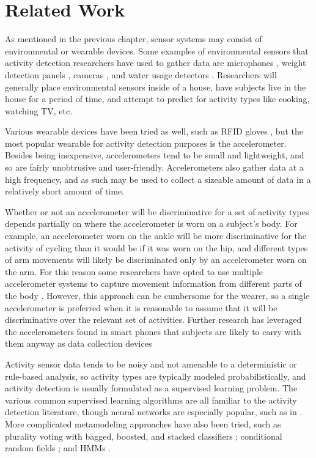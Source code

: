 \chapter{Related Work}
As mentioned in the previous chapter, sensor systems may consist
of environmental or wearable devices. Some examples of environmental
sensors that activity detection researchers have used to
gather data are microphones \cite{fogarty06}, weight detection
panels \cite{rowan05}, cameras \cite{duong05}, and water usage detectors
\cite{fogarty06}. Researchers will generally place environmental sensors
inside of a house, have subjects live in the house for a period of time, and
attempt to predict for activity types like cooking, watching TV, etc.

Various wearable devices have been tried as well, such as RFID gloves
\cite{rowan05}, but the most popular wearable for activity detection
purposes is the accelerometer. Besides being inexpensive, accelerometers
tend to be small and lightweight, and so are fairly unobtrusive and
user-friendly. Accelerometers also gather data at a high frequency, and as such
may be used to collect a sizeable amount of data in a relatively short amount
of time.

Whether or not an accelerometer will be discriminative for a
set of activity types depends partially on where the accelerometer is worn on
a subject's body. For example, an accelerometer worn on the ankle will be
more discriminative for the activity of cycling than it would be if it was worn
on the hip, and different types of arm movements will likely be
discriminated only by an accelerometer worn on the arm. For this reason some
researchers have opted to use multiple accelerometer systems to capture
movement information from different parts of the body \cite{bao04}
\cite{devries11}. However, this approach can be cumbersome for the wearer, so a
single accelerometer is preferred when it is reasonable to assume that it will
be discriminative over the relevant set of activities. Further research has
leveraged the accelerometers found in smart phones that subjects
are likely to carry with them anyway as data collection devices
\cite{bao04} \cite{choudhury08} \cite{kwapitz10}

Activity sensor data tends to be noisy and not amenable to a
deterministic or rule-based analysis, so activity types are typically modeled
probabilistically, and activity detection is usually formulated as a supervised
learning problem. The various common supervised learning algorithms are all
familiar to the activity detection literature, though neural networks are
especially popular, such as in \cite{aminian95} \cite{song07} \cite{staudenmeyer09}.
More complicated metamodeling approaches have also been tried, such as
plurality voting with bagged, boosted, and stacked classifiers \cite{ravi05};
conditional random fields \cite{blanke10} \cite{gu09} \cite{vankasteren08} \cite{wu09}; and HMMs
\cite{gu09} \cite{lester05} \cite{pober06} \cite{wu09}.

